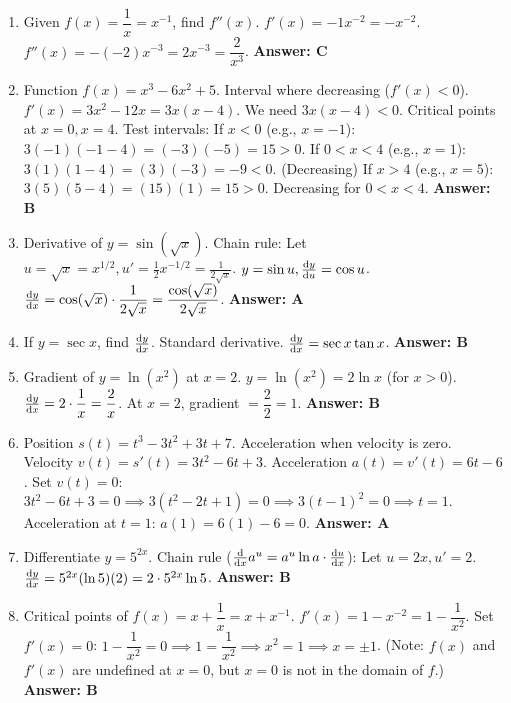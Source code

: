 \begin{enumerate}[label={\arabic*.}]
  \item Given \(f(x) = \dfrac{1}{x} = x^{-1}\), find \(f''(x)\).
    \(f'(x) = -1x^{-2} = -x^{-2}\).
    \(f''(x) = -(-2)x^{-3} = 2x^{-3} = \dfrac{2}{x^3}\).
    \textbf{Answer: C}

  \item Function \(f(x) = x^3 - 6x^2 + 5\). Interval where decreasing (\(f'(x) < 0\)).
    \(f'(x) = 3x^2 - 12x = 3x(x-4)\).
    We need \(3x(x-4) < 0\). Critical points at \(x=0, x=4\).
    Test intervals:
    If \(x<0\) (e.g., \(x=-1\)): \(3(-1)(-1-4) = (-3)(-5) = 15 > 0\).
    If \(0<x<4\) (e.g., \(x=1\)): \(3(1)(1-4) = (3)(-3) = -9 < 0\). (Decreasing)
    If \(x>4\) (e.g., \(x=5\)): \(3(5)(5-4) = (15)(1) = 15 > 0\).
    Decreasing for \(0 < x < 4\).
    \textbf{Answer: B}

  \item Derivative of \(y = \sin(\sqrt{x})\).
    Chain rule: Let \(u=\sqrt{x}=x^{1/2}, u'=\frac{1}{2}x^{-1/2} = \frac{1}{2\sqrt{x}}\).
    \(y=\sin u, \frac{\mathrm{d}y}{\mathrm{d}u}=\cos u\).
    \(\frac{\mathrm{d}y}{\mathrm{d}x} = \cos(\sqrt{x}) \cdot \dfrac{1}{2\sqrt{x}} = \dfrac{\cos(\sqrt{x})}{2\sqrt{x}}\).
    \textbf{Answer: A}

  \item If \(y = \sec x\), find \(\frac{\mathrm{d}y}{\mathrm{d}x}\). Standard derivative.
    \(\frac{\mathrm{d}y}{\mathrm{d}x} = \sec x \tan x\).
    \textbf{Answer: B}

  \item Gradient of \(y = \ln(x^2)\) at \(x=2\).
    \(y = \ln(x^2) = 2\ln x\) (for \(x>0\)).
    \(\frac{\mathrm{d}y}{\mathrm{d}x} = 2 \cdot \dfrac{1}{x} = \dfrac{2}{x}\).
    At \(x=2\), gradient \(= \dfrac{2}{2} = 1\).
    \textbf{Answer: B}

  \item Position \(s(t) = t^3 - 3t^2 + 3t + 7\). Acceleration when velocity is zero.
    Velocity \(v(t) = s'(t) = 3t^2 - 6t + 3\).
    Acceleration \(a(t) = v'(t) = 6t - 6\).
    Set \(v(t)=0\): \(3t^2 - 6t + 3 = 0 \implies 3(t^2-2t+1)=0 \implies 3(t-1)^2=0 \implies t=1\).
    Acceleration at \(t=1\): \(a(1) = 6(1) - 6 = 0\).
    \textbf{Answer: A}

  \item Differentiate \(y = 5^{2x}\).
    Chain rule (\(\frac{\mathrm{d}}{\mathrm{d}x}a^u = a^u \ln a \cdot \frac{\mathrm{d}u}{\mathrm{d}x}\)): Let \(u=2x, u'=2\).
    \(\frac{\mathrm{d}y}{\mathrm{d}x} = 5^{2x} (\ln 5) (2) = 2 \cdot 5^{2x} \ln 5\).
    \textbf{Answer: B}

  \item Critical points of \(f(x) = x + \dfrac{1}{x} = x + x^{-1}\).
    \(f'(x) = 1 - x^{-2} = 1 - \dfrac{1}{x^2}\).
    Set \(f'(x)=0\): \(1 - \dfrac{1}{x^2} = 0 \implies 1 = \dfrac{1}{x^2} \implies x^2=1 \implies x = \pm 1\).
    (Note: \(f(x)\) and \(f'(x)\) are undefined at \(x=0\), but \(x=0\) is not in the domain of \(f\).)
    \textbf{Answer: B}


\end{enumerate}
